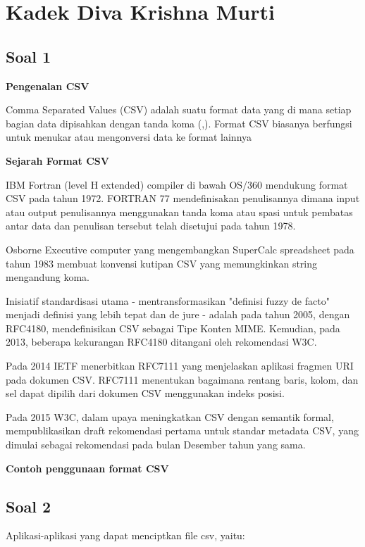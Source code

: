 \section{Kadek Diva Krishna Murti}
\subsection{Soal 1}
\textbf{Pengenalan CSV}

Comma Separated Values (CSV) adalah suatu format data yang di mana setiap bagian data dipisahkan dengan tanda koma (,). Format CSV biasanya berfungsi untuk menukar atau mengonversi data ke format lainnya 

\textbf{Sejarah Format CSV}

IBM Fortran (level H extended) compiler di bawah OS/360 mendukung format CSV pada tahun 1972. FORTRAN 77 mendefinisakan penulisannya dimana input atau output penulisannya menggunakan tanda koma atau spasi untuk pembatas antar data dan penulisan tersebut telah disetujui pada tahun 1978.

Osborne Executive computer yang mengembangkan SuperCalc spreadsheet pada tahun 1983 membuat konvensi kutipan CSV yang memungkinkan string mengandung koma.

Inisiatif standardisasi utama - mentransformasikan "definisi fuzzy de facto" menjadi definisi yang lebih tepat dan de jure - adalah pada tahun 2005, dengan RFC4180, mendefinisikan CSV sebagai Tipe Konten MIME. Kemudian, pada 2013, beberapa kekurangan RFC4180 ditangani oleh rekomendasi W3C.

Pada 2014 IETF menerbitkan RFC7111 yang menjelaskan aplikasi fragmen URI pada dokumen CSV. RFC7111 menentukan bagaimana rentang baris, kolom, dan sel dapat dipilih dari dokumen CSV menggunakan indeks posisi.

Pada 2015 W3C, dalam upaya meningkatkan CSV dengan semantik formal, mempublikasikan draft rekomendasi pertama untuk standar metadata CSV, yang dimulai sebagai rekomendasi pada bulan Desember tahun yang sama.

\textbf{Contoh penggunaan format CSV}



\subsection{Soal 2}
Aplikasi-aplikasi yang dapat menciptkan file csv, yaitu:

